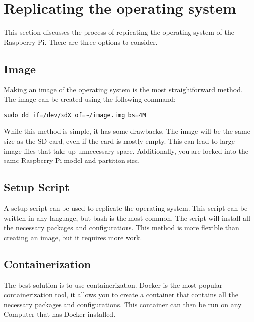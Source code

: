 \section{Replicating the operating system}
This section discusses the process of replicating the
operating system of the Raspberry Pi. There are three options
to consider. 
    \subsection{Image}
    Making an image of the operating system is the most
    straightforward method. The image can be created using
    the following command:
    \begin{verbatim}
sudo dd if=/dev/sdX of=~/image.img bs=4M
    \end{verbatim}
    While this method is simple, it has some drawbacks. The
    image will be the same size as the SD card, even if the
    card is mostly empty. This can lead to large image files
    that take up unnecessary space. Additionally, you are
    locked into the same Raspberry Pi model and partition
    size.

    \subsection{Setup Script}
    A setup script can be used to replicate the operating
    system. This script can be written in any language, but
    bash is the most common. The script will install all the
    necessary packages and configurations. This method is
    more flexible than creating an image, but it requires
    more work.

    \subsection{Containerization}
    The best solution is to use containerization. Docker is
    the most popular containerization tool, it allows
    you to create a container that contains all the necessary
    packages and configurations. This container can then be
    run on any Computer that has Docker installed. 
